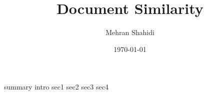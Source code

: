 \documentclass{article}
\title{Document Similarity }
\author{Mehran Shahidi}
\date{\today}
\begin{document}
\maketitle
{}
{summary}
\newpage
\tableofcontents
\newpage
{}
{intro}
{sec1}
{sec2}
{sec3}
{sec4}
\newpage
\end{document}
